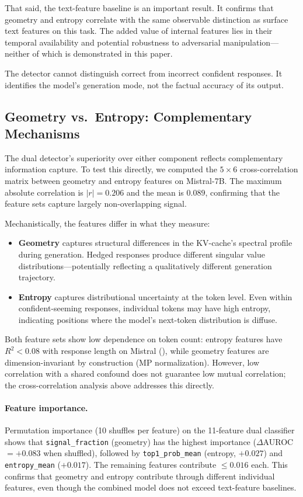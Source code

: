 \documentclass[11pt,a4paper]{article}
\begin{document}
That said, the text-feature baseline is an important result. It confirms that geometry and entropy correlate with the same observable distinction as surface text features on this task. The added value of internal features lies in their temporal availability and potential robustness to adversarial manipulation---neither of which is demonstrated in this paper.

The detector cannot distinguish correct from incorrect confident responses. It identifies the model's generation mode, not the factual accuracy of its output.

\subsection{Geometry vs.\ Entropy: Complementary Mechanisms}
\label{sec:complementarity}

The dual detector's superiority over either component reflects complementary information capture. To test this directly, we computed the $5 \times 6$ cross-correlation matrix between geometry and entropy features on Mistral-7B. The maximum absolute correlation is $|r| = 0.206$ and the mean is $0.089$, confirming that the feature sets capture largely non-overlapping signal.

Mechanistically, the features differ in what they measure:

\begin{itemize}[nosep]
    \item \textbf{Geometry} captures structural differences in the KV-cache's spectral profile during generation. Hedged responses produce different singular value distributions---potentially reflecting a qualitatively different generation trajectory.
    \item \textbf{Entropy} captures distributional uncertainty at the token level. Even within confident-seeming responses, individual tokens may have high entropy, indicating positions where the model's next-token distribution is diffuse.
\end{itemize}

Both feature sets show low dependence on token count: entropy features have $R^2 < 0.08$ with response length on Mistral (), while geometry features are dimension-invariant by construction (MP normalization). However, low correlation with a shared confound does not guarantee low mutual correlation; the cross-correlation analysis above addresses this directly.

\paragraph{Feature importance.} Permutation importance (10 shuffles per feature) on the 11-feature dual classifier shows that \texttt{signal\_fraction} (geometry) has the highest importance ($\Delta$AUROC $= +0.083$ when shuffled), followed by \texttt{top1\_prob\_mean} (entropy, $+0.027$) and \texttt{entropy\_mean} ($+0.017$). The remaining features contribute $\leq 0.016$ each. This confirms that geometry and entropy contribute through different individual features, even though the combined model does not exceed text-feature baselines.
\end{document}
